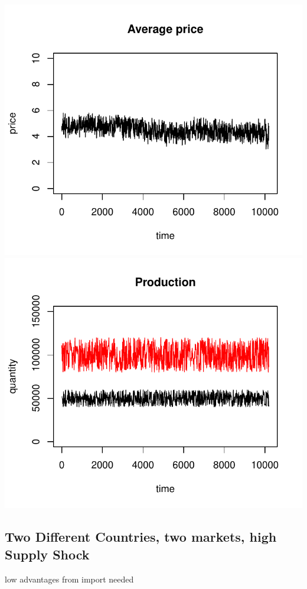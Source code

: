 \documentclass{article}
\begin{document}
\noindent
\vskip-5mm
\hskip-1cm
\includegraphics[scale=0.5]{fig_case06_price}
\includegraphics[scale=0.5]{fig_case06_production}

\newpage

\subsection{Two Different Countries, two markets, high Supply Shock}
low advantages from import needed
\end{document}
